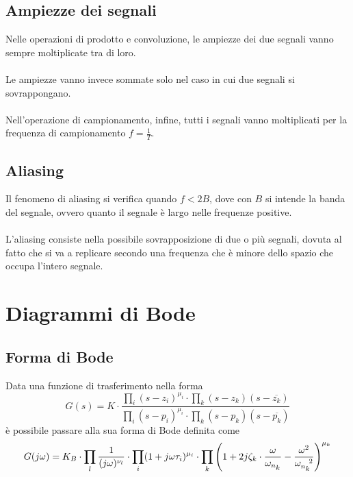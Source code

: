 \documentclass[a4paper]{article}
\begin{document}
	\subsection{Ampiezze dei segnali}
	Nelle operazioni di prodotto e convoluzione, le ampiezze dei due segnali vanno sempre moltiplicate tra di loro.
	\\ \\
	Le ampiezze vanno invece sommate solo nel caso in cui due segnali si sovrappongano.
	\\ \\
	Nell'operazione di campionamento, infine, tutti i segnali vanno moltiplicati per la frequenza di campionamento $f = \frac{1}{T}$.
	
	\subsection{Aliasing}
	Il fenomeno di aliasing si verifica quando $f < 2B$, dove con $B$ si intende la banda del segnale, ovvero quanto il segnale è largo nelle frequenze positive.
	\\ \\
	L'aliasing consiste nella possibile sovrapposizione di due o più segnali, dovuta al fatto che si va a replicare secondo una frequenza che è minore dello spazio che occupa l'intero segnale.
	\newpage
	
	
	\section{Diagrammi di Bode}
	
	\subsection{Forma di Bode}
	Data una funzione di trasferimento nella forma
	\[
	G(s) = K \cdot \frac{\prod_i (s-z_i)^{\mu_i} \cdot \prod_k (s-z_k)(s- \overline{z_k})}{\prod_i (s-p_i)^{\mu_i} \cdot \prod_k (s-p_k)(s- \overline{p_k})} 
	\]
	è possibile passare alla sua forma di Bode definita come
	\[
	G(j\omega) = K_B \cdot \prod_l \frac{1}{(j\omega)^{\nu_l}} \cdot \prod_i (1+j\omega \tau_i)^{\mu_i} \cdot \prod_k \left( 1+2j\zeta_k \cdot \frac{\omega}{\omega_{n \textsubscript{$k$}}} - \frac{\omega^2}{\omega^{\text{ }\text{ }\text{ }2}_{n \textsubscript{$k$}}} \right)^{\mu_k}
	\]
\end{document}
